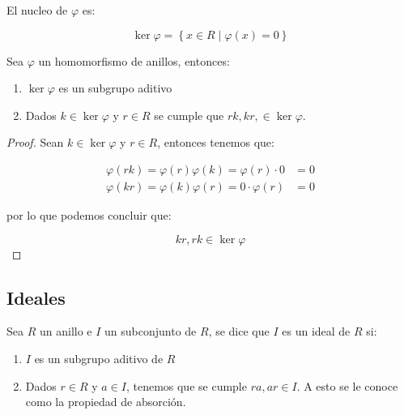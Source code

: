         \begin{definicion}
            El nucleo de $\varphi$ es:

            \begin{equation}
                \ker{\varphi} = \left\{ x \in R \mid \varphi(x) = 0 \right\}
            \end{equation}
        \end{definicion}

        \begin{proposicion}
            Sea $\varphi$ un homomorfismo de anillos, entonces:

            \begin{enumerate}
                \item $\ker{\varphi}$ es un subgrupo aditivo
                \item Dados $k \in \ker{\varphi}$ y $r \in R$ se cumple que $rk, kr, \in \ker{\varphi}$.
            \end{enumerate}
        \end{proposicion}

        \begin{proof}
            Sean $k \in \ker{\varphi}$ y $r \in R$, entonces tenemos que:

            \begin{align*}
                \varphi(rk) = \varphi(r) \varphi(k) = \varphi(r) \cdot 0 &= 0 \\
                \varphi(kr) = \varphi(k) \varphi(r) = 0 \cdot \varphi(r) &= 0
            \end{align*}

            por lo que podemos concluir que:

            \begin{equation*}
                kr, rk \in \ker{\varphi}
            \end{equation*}
        \end{proof}

    \newpage
    \subsection{Ideales}

        \begin{definicion}
            Sea $R$ un anillo e $I$ un subconjunto de $R$, se dice que $I$ es un ideal de $R$ si:

            \begin{enumerate}
                \item $I$ es un subgrupo aditivo de $R$
                \item Dados $r \in R$ y $a \in I$, tenemos que se cumple $ra, ar \in I$. A esto se le conoce como la propiedad de absorción.
            \end{enumerate}
        \end{definicion}

